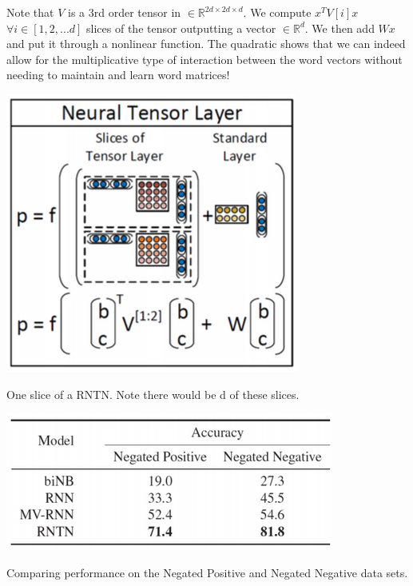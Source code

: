\documentclass{tufte-handout}
\begin{document}
Note that $V$ is a 3rd order tensor in $\in \mathbb{R}^{2d \times 2d \times d}$.  We compute $ x^T V[i] x $  $\forall i \in [1, 2, ... d]$ slices of the tensor outputting a vector $\in \mathbb{R}^{d}$. We then add $Wx$ and put it through a nonlinear function. The quadratic shows that we can indeed allow for the multiplicative type of interaction between the word vectors without needing to maintain and learn word matrices!


\begin{marginfigure}%
  \includegraphics[width=\linewidth]{img10}
  \caption{One slice of a RNTN. Note there would be d of these slices.}
  \label{fig:img10}
\end{marginfigure}


\begin{marginfigure}%
  \includegraphics[width=\linewidth]{img11}
  \caption{Comparing performance on the Negated Positive and Negated Negative data sets.}
  \label{fig:img11}
\end{marginfigure}
\end{document}
